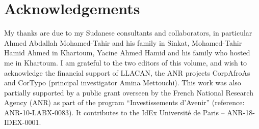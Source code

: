 \documentclass[output=paper]{langsci/langscibook}
\begin{document}
\section*{Acknowledgements}

My thanks are due to my Sudanese consultants and collaborators, in particular Ahmed Abdallah Mohamed-Tahir and his family in Sinkat, Mohamed-Tahir Hamid Ahmed in Khartoum, Yacine Ahmed Hamid and his family who hosted me in Khartoum. I am grateful to the two editors of this volume, and wish to acknowledge the financial support of LLACAN, the ANR projects CorpAfroAs and CorTypo (principal investigator Amina Mettouchi). This work was also partially supported by a public grant overseen by the French National Research Agency (ANR) as part of the program “Investissements d'Avenir” (reference: ANR-10-LABX-0083). It contributes to the IdEx Université de Paris -- ANR-18-IDEX-0001.
\end{document}
